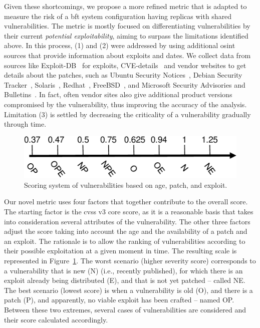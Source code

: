 Given these shortcomings, we propose a more refined metric that is adapted to measure the risk of a \gls{bft} system configuration having replicas with shared vulnerabilities.
The metric is mostly focused on differentiating vulnerabilities by their current \emph{potential exploitability}, aiming to surpass the limitations identified above.
In this process, (1) and (2) were addressed by using additional \gls{osint} sources that provide information about exploits and dates. 
We collect data from sources like Exploit-DB~\cite{edb} for exploits, CVE-details~\cite{cvedetails} and vendor websites to get details about the patches, such as Ubuntu Security Notices~\cite{ubuntu}, Debian Security Tracker~\cite{debian}, Solaris~\cite{solaris}, Redhat~\cite{redhat}, FreeBSD~\cite{freebsd}, and Microsoft Security Advisories and Bulletins~\cite{microsoft}. In fact, often vendor sites also give additional product versions compromised by the vulnerability, thus improving the accuracy of the analysis. 
Limitation (3) is settled by decreasing the criticality of a vulnerability gradually through time.


\begin{figure}[h]
\begin{center}
\includegraphics[width=0.7\columnwidth]{images/images/scale.pdf}
\caption{Scoring system of vulnerabilities based on age, patch, and exploit.}
\label{fig:scale}
\end{center}
\end{figure}


Our novel metric uses four factors that together contribute to the overall score. 
The starting factor is the \gls{cvss} v3 core score, as it is a reasonable basis that takes into consideration several attributes of the vulnerability.
The other three factors adjust the score taking into account the age and the availability of a patch and an exploit. 
The rationale is to allow the ranking of vulnerabilities according to their possible exploitation at a given moment in time.
The resulting scale is represented in Figure~\ref{fig:scale}.
The worst scenario (higher severity score) corresponds to a vulnerability that is new (N) (i.e., recently published), for which there is an exploit already being distributed (E), and that is not yet patched -- called NE.
The best scenario (lowest score) is when a vulnerability is old (O), and there is a patch (P), and apparently, no viable exploit has been crafted -- named OP. 
Between these two extremes, several cases of vulnerabilities are considered and their score calculated accordingly.



